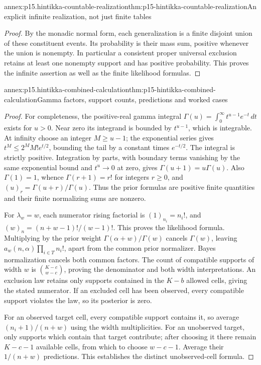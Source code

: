 \begin{annexitem}{annex:p15.hintikka-countable-realization}{thm:p15-hintikka-countable-realization}{An explicit infinite realization, not just finite tables}
\begin{proof}
By the monadic normal form, each generalization is a finite disjoint
union of these constituent events. Its probability is their mass sum,
positive whenever the union is nonempty. In particular a consistent
proper universal exclusion retains at least one nonempty support and
has positive probability. This proves the infinite assertion as well
as the finite likelihood formulas.
\end{proof}
\end{annexitem}

\begin{annexitem}{annex:p15.hintikka-combined-calculation}{thm:p15-hintikka-combined-calculation}{Gamma factors, support counts, predictions and worked cases}
\begin{proof}
For completeness, the positive-real gamma integral
\(\Gamma(u)=\int_0^\infty t^{u-1}e^{-t}\,dt\) exists for
\(u>0\). Near zero its integrand is bounded by \(t^{u-1}\),
which is integrable. At infinity choose an integer \(M\geq u-1\);
the exponential series gives \(t^M\leq2^MM!e^{t/2}\), bounding
the tail by a constant times \(e^{-t/2}\). The integral is strictly
positive. Integration by parts, with boundary terms vanishing by the
same exponential bound and \(t^u\to0\) at zero, gives
\(\Gamma(u+1)=u\Gamma(u)\). Also \(\Gamma(1)=1\), whence
\(\Gamma(r+1)=r!\) for integers \(r\geq0\), and
\((u)_r=\Gamma(u+r)/\Gamma(u)\). Thus the prior formulas are
positive finite quantities and their finite normalizing sums are nonzero.

For \(\lambda_w=w\), each numerator rising factorial is
\((1)_{n_i}=n_i!\), and \((w)_n=(n+w-1)!/(w-1)!\).
This proves the likelihood formula. Multiplying by the prior weight
\(\Gamma(\alpha+w)/\Gamma(w)\) cancels \(\Gamma(w)\),
leaving \(a_w(n,\alpha)\prod_{i\in T}n_i!\), apart from the
common prior normalizer. Bayes normalization cancels both common
factors. The count of compatible supports of width \(w\) is
\(\binom{K-c}{w-c}\), proving the denominator and both width
interpretations. An exclusion law retains only supports contained in
the \(K-b\) allowed cells, giving the stated numerator. If an
excluded cell has been observed, every compatible support violates the
law, so its posterior is zero.

For an observed target cell, every compatible support contains it, so
average \((n_i+1)/(n+w)\) using the width multiplicities. For an
unobserved target, only supports which contain that target contribute;
after choosing it there remain \(K-c-1\) available cells, from which
to choose \(w-c-1\). Average their \(1/(n+w)\) predictions.
This establishes the distinct unobserved-cell formula.


\end{proof}
\end{annexitem}
